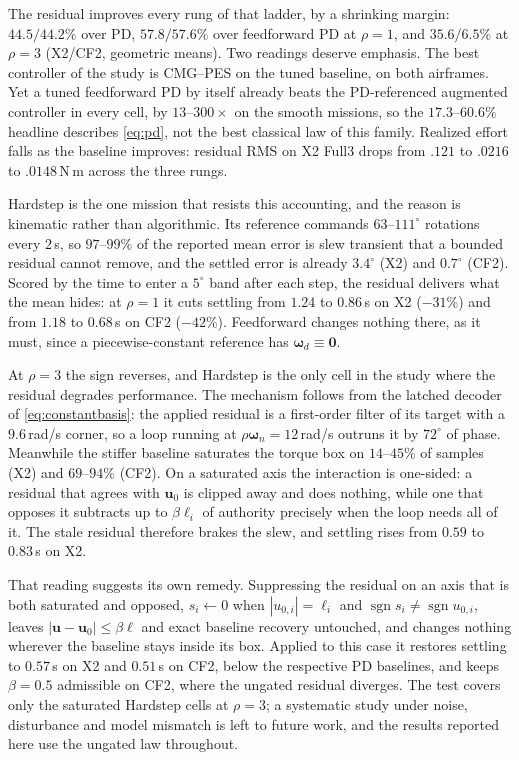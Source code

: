 \documentclass[letterpaper, 10 pt, conference]{ieeeconf}
\begin{document}
The residual improves every rung of that ladder, by a shrinking margin:
$44.5/44.2\%$ over PD, $57.8/57.6\%$ over feedforward PD at $\rho=1$, and
$35.6/6.5\%$ at $\rho=3$ (X2/CF2, geometric means). Two readings deserve
emphasis. The best controller of the study is CMG--PES on the tuned baseline,
on both airframes. Yet a tuned feedforward PD by itself already beats the
PD-referenced augmented controller in every cell, by $13$--$300\times$ on the
smooth missions, so the $17.3$--$60.6\%$ headline describes \eqref{eq:pd}, not
the best classical law of this family. Realized effort falls as the baseline
improves: residual RMS on X2 Full3 drops from $.121$ to $.0216$ to
$.0148$\,N\,m across the three rungs.

Hardstep is the one mission that resists this accounting, and the reason is
kinematic rather than algorithmic. Its reference commands $63$--$111^\circ$
rotations every $2$\,s, so $97$--$99\%$ of the reported mean error is slew
transient that a bounded residual cannot remove, and the settled error is
already $3.4^\circ$ (X2) and $0.7^\circ$ (CF2). Scored by the time to enter a
$5^\circ$ band after each step, the residual delivers what the mean hides: at
$\rho=1$ it cuts settling from $1.24$ to $0.86$\,s on X2 ($-31\%$) and from
$1.18$ to $0.68$\,s on CF2 ($-42\%$). Feedforward changes nothing there, as it
must, since a piecewise-constant reference has $\bm\omega_d\equiv\bm0$.

At $\rho=3$ the sign reverses, and Hardstep is the only cell in the study where
the residual degrades performance. The mechanism follows from the latched
decoder of \eqref{eq:constantbasis}: the applied residual is a first-order
filter of its target with a $9.6$\,rad/s corner, so a loop running at
$\rho\bm\omega_n=12$\,rad/s outruns it by $72^\circ$ of phase. Meanwhile the
stiffer baseline saturates the torque box on $14$--$45\%$ of samples (X2) and
$69$--$94\%$ (CF2). On a saturated axis the interaction is one-sided: a residual
that agrees with $\bm u_0$ is clipped away and does nothing, while one that
opposes it subtracts up to $\beta\ell_i$ of authority precisely when the loop
needs all of it. The stale residual therefore brakes the slew, and settling
rises from $0.59$ to $0.83$\,s on X2.

That reading suggests its own remedy. Suppressing the residual on an axis that
is both saturated and opposed, $s_i\!\leftarrow\!0$ when $|u_{0,i}|=\ell_i$ and
$\operatorname{sgn}s_i\neq\operatorname{sgn}u_{0,i}$, leaves
$|\bm u-\bm u_0|\le\beta\bm\ell$ and exact baseline recovery untouched, and
changes nothing wherever the baseline stays inside its box. Applied to this
case it restores settling to $0.57$\,s on X2 and $0.51$\,s on CF2, below the
respective PD baselines, and keeps $\beta=0.5$ admissible on CF2, where the
ungated residual diverges. The test covers only the saturated Hardstep cells at
$\rho=3$; a systematic study under noise, disturbance and model mismatch is left
to future work, and the results reported here use the ungated law throughout.
\end{document}
